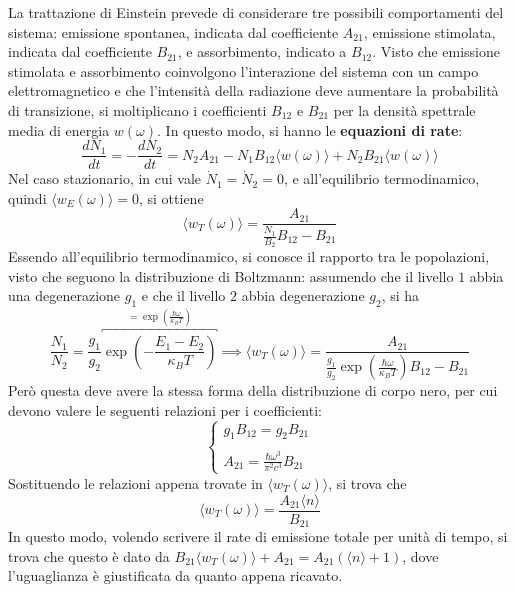 \documentclass[11pt, a4paper]{scrartcl}
\theoremstyle{style}
\numberwithin{equation}{subsection}
\begin{document}
La trattazione di Einstein prevede di considerare tre possibili comportamenti del sistema: emissione spontanea, indicata dal coefficiente $A_{21}$, emissione stimolata, indicata dal coefficiente $B_{21}$, e assorbimento, indicato a $B_{12}$. 
Visto che emissione stimolata e assorbimento coinvolgono l'interazione del sistema con un campo elettromagnetico e che l'intensit\`a della radiazione deve aumentare la probabilit\`a di transizione, si moltiplicano i coefficienti $B_{12}$ e $B_{21}$ per la densit\`a spettrale media di energia $w(\omega )$.
In questo modo, si hanno le \textbf{equazioni di rate}:
\begin{equation}
	\frac{d N_1}{d t}  = - \frac{d N_2}{d t}  = N_2 A_{21} - N_1 B_{12} \langle w(\omega ) \rangle + N_2 B_{21} \langle w(\omega ) \rangle
\end{equation}
Nel caso stazionario, in cui vale $\dot{N}_1 = \dot{N}_2 = 0$, e all'equilibrio termodinamico, quindi $\langle w_E(\omega ) \rangle = 0$, si ottiene
\begin{equation}
	\langle w_T(\omega ) \rangle = \frac{A_{21}}{\frac{N_1}{B_2}B_{12} - B_{21}}
\end{equation}
Essendo all'equilibrio termodinamico, si conosce il rapporto tra le popolazioni, visto che seguono la distribuzione di Boltzmann: assumendo che il livello $1$ abbia una degenerazione $g_1$ e che il livello $2$ abbia degenerazione $g_2$, si ha
\[
	\frac{N_1}{N_2} = \frac{g_1}{g_2} \overbracket{\exp \left(- \frac{E_1 - E_2}{\kappa _B T}\right) }^{= \exp \left(\frac{\hbar \omega}{\kappa _BT}\right) } \implies \langle w_T(\omega ) \rangle = \frac{A_{21}}{\displaystyle \frac{g_1}{g_2}\exp\left(\frac{\hbar \omega }{\kappa _B T}\right) B_{12}-B_{21}}
\] 
Per\`o questa deve avere la stessa forma della distribuzione di corpo nero, per cui devono valere le seguenti relazioni per i coefficienti:
\begin{equation}
	\begin{cases}
		g_1 B_{12} =g_2 B_{21}\\
		\\
		\displaystyle A_{21} = \frac{\hbar \omega ^3}{\pi^2 c^3}B_{21}
	\end{cases}
\end{equation}
Sostituendo le relazioni appena trovate in $\langle w_T(\omega ) \rangle$, si trova che
\begin{equation}
	\langle w_T(\omega ) \rangle = \frac{A_{21}\langle n \rangle}{B_{21}}
\end{equation}
In questo modo, volendo scrivere il rate di emissione totale per unit\`a di tempo, si trova che questo \`e dato da $B_{21} \langle w_T(\omega ) \rangle + A_{21} = A_{21}\left(\langle n \rangle + 1\right) $, dove l'uguaglianza \`e giustificata da quanto appena ricavato.
\end{document}
